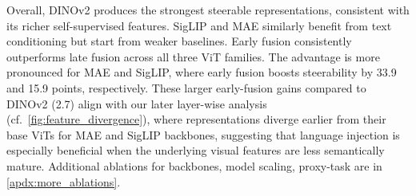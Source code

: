 Overall, DINOv2 produces the strongest steerable representations, consistent with its richer self-supervised features. SigLIP and MAE similarly benefit from text conditioning but start from weaker baselines.
Early fusion consistently outperforms late fusion across all three ViT families.
The advantage is more pronounced for MAE and SigLIP, where early fusion boosts steerability by 33.9 and 15.9 points, respectively. 
These larger early-fusion gains compared to DINOv2 (2.7) align with our later layer-wise analysis (cf.~\cref{fig:feature_divergence}), where \model{} representations diverge earlier from their base ViTs for MAE and SigLIP backbones, suggesting that language injection is especially beneficial when the underlying visual features are less semantically mature.
\newline \newline
Additional ablations for backbones, model scaling, proxy-task are in \cref{apdx:more_ablations}.
